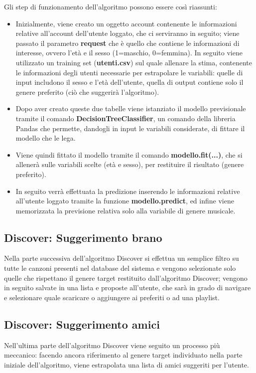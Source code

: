 Gli step di funzionamento dell'algoritmo possono essere così riassunti: 
\begin{itemize}
    \item Inizialmente, viene creato un oggetto account contenente le informazioni relative all'account dell'utente loggato, che ci serviranno in seguito; 
    viene passato il parametro \textbf{request} che è quello che contiene le informazioni di interesse, ovvero l'età e il sesso (1=maschio, 0=femmina). 
    In seguito viene utilizzato un training set (\textbf{utenti.csv}) sul quale allenare la stima, contenente le informazioni degli utenti 
    necessarie per estrapolare le variabili: quelle di input includono il sesso e l'età dell'utente, quella di output contiene solo 
    il genere preferito (ciò che suggerirà l'algoritmo). 

    \item Dopo aver creato queste due tabelle viene istanziato il modello previsionale tramite il comando \textbf{DecisionTreeClassifier}, un comando 
    della libreria Pandas che permette, dandogli in input le variabili considerate, di fittare il modello che le lega. 
    
    \item Viene quindi fittato il modello tramite il comando \textbf{modello.fit(...)}, che si allenerà sulle variabili scelte (età e sesso), per restituire 
    il risultato (genere preferito). 

    \item In seguito verrà effettuata la predizione inserendo le informazioni relative all'utente loggato tramite la funzione \textbf{modello.predict}, ed 
    infine viene memorizzata la previsione relativa solo alla variabile di genere musicale. 
    
\end{itemize}


\newpage
\subsection{Discover: Suggerimento brano}
Nella parte successiva dell'algoritmo Discover si effettua un semplice filtro su tutte le canzoni presenti nel database del sistema e vengono
 selezionate solo quelle che rispettano il genere target restituito dall'algoritmo Discover; vengono in seguito salvate in una 
 lista e proposte all'utente, che sarà in grado di navigare e selezionare quale scaricare o aggiungere ai preferiti o ad una playlist. 

\subsection{Discover: Suggerimento amici}
Nell'ultima parte dell'algoritmo Discover viene seguito un processo più meccanico: facendo ancora riferimento al genere target 
individuato nella parte iniziale dell'algoritmo, viene estrapolata una lista di amici suggeriti per l'utente. 

